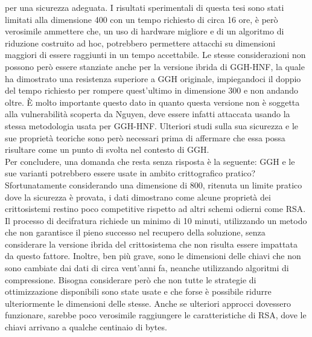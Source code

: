per una sicurezza adeguata. I risultati sperimentali di questa tesi sono stati limitati 
alla dimensione 400 con un tempo richiesto di circa 16 ore, è però verosimile ammettere che, 
un uso di hardware migliore e di un algoritmo di riduzione costruito ad hoc, potrebbero permettere
attacchi su dimensioni maggiori di essere raggiunti in un tempo accettabile. Le stesse 
considerazioni non possono però essere stanziate anche per la versione ibrida di GGH-HNF, la 
quale ha dimostrato una resistenza superiore a GGH originale, impiegandoci il doppio del 
tempo richiesto per rompere quest'ultimo in dimensione 300 e non andando oltre. È molto 
importante questo dato in quanto questa versione non è
soggetta alla vulnerabilità scoperta da Nguyen, deve essere infatti attaccata usando la stessa 
metodologia usata per GGH-HNF. Ulteriori studi sulla sua sicurezza e le sue proprietà 
teoriche sono però necessari prima di affermare che essa possa risultare come un punto 
di svolta nel contesto di GGH.\\ Per concludere, una domanda che resta senza risposta è la seguente: 
GGH e le sue varianti potrebbero essere usate in ambito crittografico pratico? Sfortunatamente
considerando una dimensione di 800, ritenuta un limite pratico dove la sicurezza è provata, 
i dati dimostrano come 
alcune proprietà dei crittosistemi restino poco competitive rispetto ad altri schemi odierni 
come RSA. Il processo di decifratura richiede un minimo di 10 minuti, 
utilizzando un metodo che non garantisce il pieno successo nel recupero della soluzione, 
senza considerare la versione ibrida del crittosistema 
che non risulta essere impattata da questo fattore. Inoltre, ben più grave, sono le dimensioni delle
chiavi che non sono cambiate dai dati di circa vent'anni fa, neanche utilizzando algoritmi 
di compressione. Bisogna considerare però che non tutte le strategie di ottimizzazione 
disponibili sono state usate e che forse è possibile ridurre ulteriormente le 
dimensioni delle stesse. Anche se ulteriori approcci dovessero funzionare, sarebbe poco 
verosimile raggiungere le caratteristiche di RSA, dove le chiavi arrivano a qualche centinaio di bytes. 